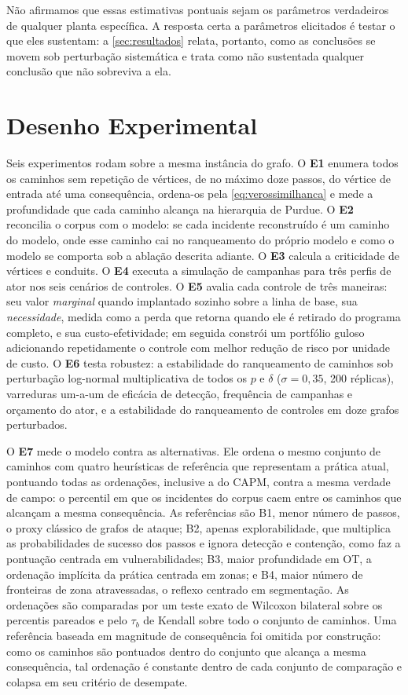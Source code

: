 Não afirmamos que essas estimativas pontuais sejam os parâmetros verdadeiros de
qualquer planta específica. A resposta certa a parâmetros elicitados é testar o que eles sustentam: a
\cref{sec:resultados} relata, portanto, como as conclusões se movem sob
perturbação sistemática e trata como não sustentada qualquer conclusão que não
sobreviva a ela.

\section{Desenho Experimental}
\label{sec:experimentos}

Seis experimentos rodam sobre a mesma instância do grafo. O \textbf{E1} enumera
todos os caminhos sem repetição de vértices, de no máximo doze passos, do
vértice de entrada até uma consequência, ordena-os pela
\cref{eq:verossimilhanca} e mede a profundidade que cada caminho alcança na
hierarquia de Purdue. O \textbf{E2} reconcilia o corpus com o modelo: se cada
incidente reconstruído é um caminho do modelo, onde esse caminho cai no
ranqueamento do próprio modelo e como o modelo se comporta sob a ablação
descrita adiante. O \textbf{E3} calcula a criticidade de vértices e conduits. O
\textbf{E4} executa a simulação de campanhas para três perfis de ator nos seis
cenários de controles. O \textbf{E5} avalia cada controle de três maneiras: seu
valor \emph{marginal} quando implantado sozinho sobre a linha de base, sua
\emph{necessidade}, medida como a perda que retorna quando ele é retirado do
programa completo, e sua custo-efetividade; em seguida constrói um portfólio
guloso adicionando repetidamente o controle com melhor redução de risco por
unidade de custo. O \textbf{E6} testa robustez: a estabilidade do ranqueamento
de caminhos sob perturbação log-normal multiplicativa de todos os $p$ e $\delta$
($\sigma = 0{,}35$, 200 réplicas), varreduras um-a-um de eficácia de detecção,
frequência de campanhas e orçamento do ator, e a estabilidade do ranqueamento
de controles em doze grafos perturbados.

O \textbf{E7} mede o modelo contra as alternativas. Ele ordena o mesmo
conjunto de caminhos com quatro heurísticas de referência que representam a
prática atual, pontuando todas as
ordenações, inclusive a do CAPM, contra a mesma verdade de campo: o percentil em
que os incidentes do corpus caem entre os caminhos que alcançam a mesma
consequência. As referências são B1, menor número de passos, o proxy clássico de
grafos de ataque; B2, apenas explorabilidade, que multiplica as probabilidades
de sucesso dos passos e ignora detecção e contenção, como faz a pontuação
centrada em vulnerabilidades; B3, maior profundidade em OT, a ordenação
implícita da prática centrada em zonas; e B4, maior número de fronteiras de zona
atravessadas, o reflexo centrado em segmentação. As ordenações são comparadas
por um teste exato de Wilcoxon bilateral sobre os percentis pareados e pelo
$\tau_b$ de Kendall sobre todo o conjunto de caminhos. Uma referência baseada em magnitude de consequência foi omitida por
construção: como os caminhos são
pontuados dentro do conjunto que alcança a mesma consequência, tal ordenação é
constante dentro de cada conjunto de comparação e colapsa em seu critério de
desempate.

